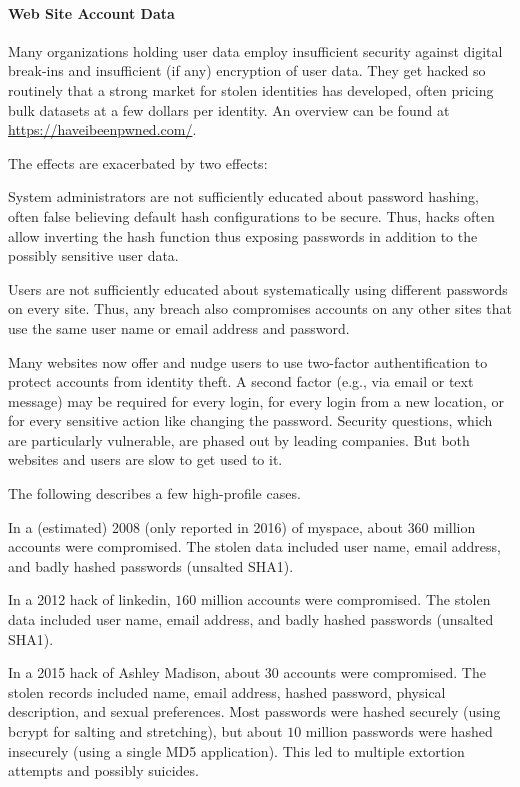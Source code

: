 \paragraph{Web Site Account Data}
Many organizations holding user data employ insufficient security against digital break-ins and insufficient (if any) encryption of user data.
They get hacked so routinely that a strong market for stolen identities has developed, often pricing bulk datasets at a few dollars per identity.
An overview can be found at \url{https://haveibeenpwned.com/}.

The effects are exacerbated by two effects:
\begin{compactitem}
 \item System administrators are not sufficiently educated about password hashing, often false believing default hash configurations to be secure.
 Thus, hacks often allow inverting the hash function thus exposing passwords in addition to the possibly sensitive user data.
 \item Users are not sufficiently educated about systematically using different passwords on every site.
 Thus, any breach also compromises accounts on any other sites that use the same user name or email address and password.
\end{compactitem}

Many websites now offer and nudge users to use two-factor authentification to protect accounts from identity theft.
A second factor (e.g., via email or text message) may be required for every login, for every login from a new location, or for every sensitive action like changing the password.
Security questions, which are particularly vulnerable, are phased out by leading companies.
But both websites and users are slow to get used to it.
\medskip

The following describes a few high-profile cases.

In a (estimated) 2008 (only reported in 2016) of myspace, about $360$ million accounts were compromised.
The stolen data included user name, email address, and badly hashed passwords (unsalted SHA1).

In a 2012 hack of linkedin, $160$ million accounts were compromised.
The stolen data included user name, email address, and badly hashed passwords (unsalted SHA1).

In a 2015 hack of Ashley Madison, about $30$ accounts were compromised.
The stolen records included name, email address, hashed password, physical description, and sexual preferences.
Most passwords were hashed securely (using bcrypt for salting and stretching), but about $10$ million passwords were hashed insecurely (using a single MD5 application).
This led to multiple extortion attempts and possibly suicides.

